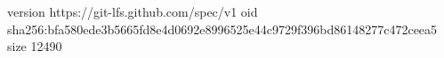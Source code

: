 version https://git-lfs.github.com/spec/v1
oid sha256:bfa580ede3b5665fd8e4d0692e8996525e44c9729f396bd86148277c472ceea5
size 12490
